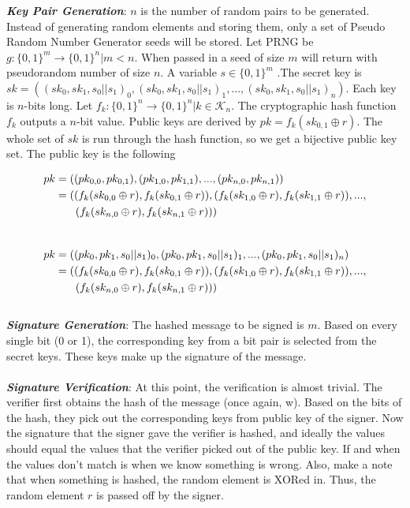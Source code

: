 \documentclass[]{scrartcl}
\makeatletter
\newcommand{\mathleft}{\@fleqntrue\@mathmargin0pt}
\makeatother
\begin{document}
\textbf{\textit{Key Pair Generation}}: $n$ is the number of random pairs to be generated. Instead of generating random elements and storing them, only a set of Pseudo Random Number Generator seeds will be stored. Let PRNG be $g : \{0,1\}^m \rightarrow \{0,1\}^n | m < n$. When passed in a seed of size $m$ will return with pseudorandom number of size $n$. A variable $s \in \{0,1\}^m$ .The secret key is $sk = ((sk_0, sk_1, s_0||s_1)_0,(sk_0, sk_1, s_0||s_1)_1,...,(sk_0, sk_1, s_0||s_1)_n)$. Each key is $n$-bits long. Let $f_k : \{0,1\}^n \rightarrow \{0,1\}^n | k \in \mathcal{K}_n$. The cryptographic hash function $f_k$ outputs a $n$-bit value. Public keys are derived by $pk = f_k(sk_{0,1} \oplus r)$. The whole set of $sk$ is run through the hash function, so we get a bijective public key set. The public key is the following 
\mathleft

\begin{equation}
\begin{split}
pk & = ((pk_{0,0}, pk_{0,1}),(pk_{1,0}, pk_{1,1}),...,(pk_{n,0}, pk_{n,1})) \\
& = ((f_k(sk_{0,0} \oplus r), f_k(sk_{0,1}\oplus r)),(f_k(sk_{1,0} \oplus r), f_k(sk_{1,1}\oplus r)),...,\\
& \hspace{0.65cm}(f_k(sk_{n,0} \oplus r), f_k(sk_{n,1}\oplus r)))
\end{split}
\end{equation} \\

\begin{equation}
	\begin{split}
		pk & = ((pk_0, pk_1, s_0||s_1)_0,(pk_0, pk_1, s_0||s_1)_1,...,(pk_0, pk_1, s_0||s_1)_n) \\
		& = ((f_k(sk_{0,0} \oplus r), f_k(sk_{0,1}\oplus r)),(f_k(sk_{1,0} \oplus r), f_k(sk_{1,1}\oplus r)),...,\\
		& \hspace{0.65cm}(f_k(sk_{n,0} \oplus r), f_k(sk_{n,1}\oplus r)))
	\end{split}
\end{equation} \\


\textbf{\textit{Signature Generation}}: The hashed message to be signed is $m$. Based on every single bit (0 or 1), the corresponding key from a bit pair is selected from the secret keys. These keys make up the signature of the message.\\ \\
\textbf{\textit{Signature Verification}}: At this point, the verification is almost trivial. The verifier first obtains the hash of the message (once again, w). Based on the bits of the hash, they pick out the corresponding keys from public key of the signer. Now the signature that the signer gave the verifier is hashed, and ideally the values should equal the values that the verifier picked out of the public key. If and when the values don't match is when we know something is wrong. Also, make a note that when something is hashed, the random element is XORed in. Thus, the random element $r$ is passed off by the signer.
\end{document}
